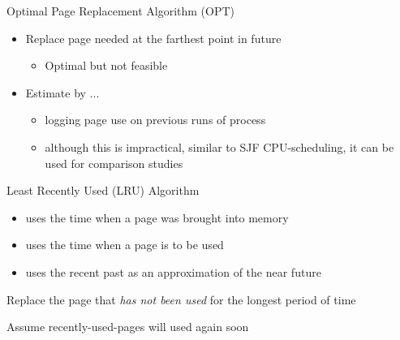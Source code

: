 \begin{frame}{Optimal Page Replacement Algorithm (OPT)}
  \begin{center}
  \end{center}
  \begin{itemize}
  \item Replace page needed at the farthest point in future
    \begin{itemize}
    \item Optimal but not feasible
    \end{itemize}
  \item Estimate by ...
    \begin{itemize}
    \item logging page use on previous runs of process
    \item although this is impractical, similar to SJF CPU-scheduling, it can be used for
      comparison studies
    \end{itemize}
  \end{itemize}
\end{frame}

\begin{frame}{Least Recently Used (LRU) Algorithm}
  \begin{itemize}
  \item[FIFO] uses the time when a page was brought into memory
  \item[OPT] uses the time when a page is to be used
  \item[LRU] uses the recent past as an approximation of the near future
  \end{itemize}
  Replace the page that \emph{has not been used} for the longest period of time
  \begin{iblock}{Assume recently-used-pages will used again soon}
    \begin{center}
    \end{center}
  \end{iblock}
\end{frame}


